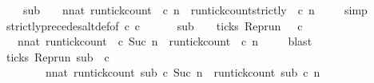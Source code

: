 \begin{isabellebody}
\isanewline
\ \ \ \ {\isacartoucheopen}sub\ {\isasymin}\ {\isacharbraceleft}\ {\isasymrho}{\isachardot}\ {\isasymforall}n{\isacharcolon}{\isacharcolon}nat{\isachardot}\ {\isacharparenleft}run{\isacharunderscore}tick{\isacharunderscore}count\ {\isasymrho}\ c\ n{\isacharparenright}\ {\isasymle}\ {\isacharparenleft}run{\isacharunderscore}tick{\isacharunderscore}count{\isacharunderscore}strictly\ {\isasymrho}\ c\ n{\isacharparenright}\ {\isacharbraceright}{\isacartoucheclose}\isanewline
\ \ \isamarkupfalse%
\ simp\isanewline
\ \ \isamarkupfalse%
\ strictly{\isacharunderscore}precedes{\isacharunderscore}alt{\isacharunderscore}def{}{\isacharbrackleft}of\ {\isacartoucheopen}c\ {\isacartoucheopen}c\ \ \isamarkupfalse%
\isanewline
\ \ \ \ {\isacartoucheopen}sub\ {\isasymin}\ {\isacharbraceleft}\ {\isasymrho}{\isachardot}\ {\isacharparenleft}{\isasymnot}ticks\ {\isacharparenleft}{\isacharparenleft}Rep{\isacharunderscore}run\ {\isasymrho}{\isacharparenright}\ {}\ c\isanewline
\ \ {\isasymand}\ {\isacharparenleft}{\isasymforall}n{\isacharcolon}{\isacharcolon}nat{\isachardot}\ {\isacharparenleft}run{\isacharunderscore}tick{\isacharunderscore}count\ {\isasymrho}\ c\ {\isacharparenleft}Suc\ n{\isacharparenright}{\isacharparenright}\ {\isasymle}\ {\isacharparenleft}run{\isacharunderscore}tick{\isacharunderscore}count\ {\isasymrho}\ c\ n{\isacharparenright}{\isacharparenright}\ {\isacharbraceright}{\isacartoucheclose}\isanewline
\ \ \isamarkupfalse%
\ blast\isanewline
\ \ \isamarkupfalse%
\ {\isacartoucheopen}{\isacharparenleft}{\isasymnot}ticks\ {\isacharparenleft}{\isacharparenleft}Rep{\isacharunderscore}run\ sub{\isacharparenright}\ {}\ c\isanewline
\ \ \ \ \ \ \ {\isasymand}\ {\isacharparenleft}{\isasymforall}n{\isacharcolon}{\isacharcolon}nat{\isachardot}\ {\isacharparenleft}run{\isacharunderscore}tick{\isacharunderscore}count\ sub\ c\ {\isacharparenleft}Suc\ n{\isacharparenright}{\isacharparenright}\ {\isasymle}\ {\isacharparenleft}run{\isacharunderscore}tick{\isacharunderscore}count\ sub\ c\ n{\isacharparenright}{\isacharparenright}{\isacartoucheclose}\isanewline

\end{isabellebody}
